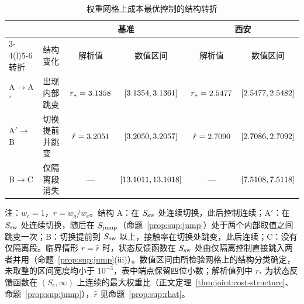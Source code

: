 \begin{table}[htbp]
\centering\small
\renewcommand{\arraystretch}{1.2}
\begin{threeparttable}
\caption{权重网格上成本最优控制的结构转折}
\label{tab:joint:weight-transitions}
\begin{tabular*}{\linewidth}{@{\extracolsep{\fill}}llcccc@{}}
\toprule
 & & \multicolumn{2}{c}{基准} & \multicolumn{2}{c}{西安}\\
\cmidrule(lr){3-4}\cmidrule(l){5-6}
转折 & 结构变化 & 解析值 & 数值区间 & 解析值 & 数值区间\\
\midrule
A$\to$A$'$ & 出现内部跳变 & $r_*=3.1358$ & $[3.1354,3.1361]$ & $r_*=2.5477$ & $[2.5477,2.5482]$\\
A$'\to$B & 切换提前并跳变 & $\hat r=3.2051$ & $[3.2050,3.2057]$ & $\hat r=2.7090$ & $[2.7086,2.7092]$\\
B$\to$C & 仅隔离段消失 & — & $[13.1011,13.1018]$ & — & $[7.5108,7.5118]$\\
\bottomrule
\end{tabular*}
\begin{tablenotes}[flushleft]\footnotesize
\item 注：$w_c=1$，$r=w_q/w_c$。结构 A：在 $S_{\rm sw}$ 处连续切换，此后控制连续；A$'$：在 $S_{\rm sw}$ 处连续切换，随后在 $S_{\rm jump}$（命题~\ref{prop:sup:jump}）处于两个内部取值之间跳变一次；B：切换提前到 $S_{\rm sw}$ 以上，接触率在切换处跳变，此后连续；C：没有仅隔离段。临界情形 $r=\hat r$ 时，状态反馈函数在 $S_{\rm sw}$ 处由仅隔离控制直接跳入两者并用（命题~\ref{prop:sup:jump}(iii)）。数值区间由所检验网格上的结构分类确定，未取整的区间宽度均小于 $10^{-3}$，表中端点保留四位小数；解析值列中 $r_*$ 为状态反馈函数在 $(S_c,\infty)$ 上连续的最大权重比（正文定理~\ref{thm:joint:cost-structure}、命题~\ref{prop:sup:jump}），$\hat r$ 见命题~\ref{prop:sup:rhat}。
\end{tablenotes}
\end{threeparttable}
\end{table}

